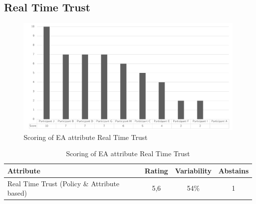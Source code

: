 \subsection{Real Time Trust}
\begin{figure}[h!]
	\centering
	\includegraphics[width=0.9\linewidth]{images/scoreearealtimetrust}
	\caption[Scoring of EA attribute Real Time Trust]{Scoring of EA attribute Real Time Trust}
	\label{fig:appscoringearealtimetrust}
\end{figure}
\begin{table}[h!]
	\centering
	\begin{tabular}{p{}ccc}
		\toprule
		\textbf{Attribute} & \textbf{Rating} & \textbf{Variability} & \textbf{Abstains} \\
		\midrule
		Real Time Trust (Policy \& Attribute based) & 5,6 & 54\% & 1 \\%
		\bottomrule
	\end{tabular}%
	\caption[Scoring of EA attribute Real Time Trust]{Scoring of EA attribute Real Time Trust}
	\label{tab:appscoringearealtimetrust}%
\end{table}%
\newpage
